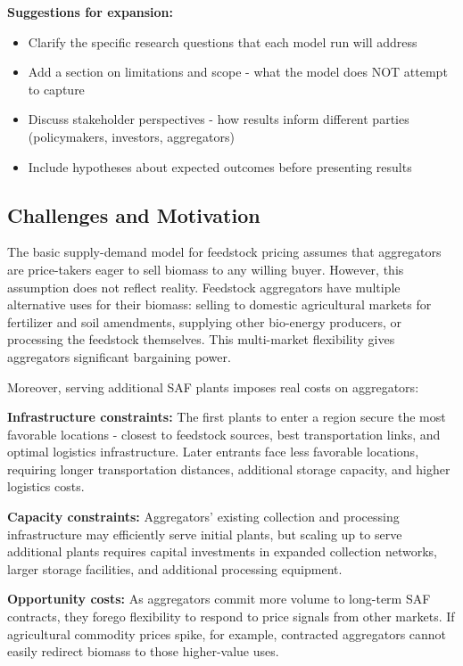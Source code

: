 \documentclass[10.5pt]{article}
\begin{document}
\textbf{Suggestions for expansion:}
\begin{itemize}
    \item Clarify the specific research questions that each model run will address
    \item Add a section on limitations and scope - what the model does NOT attempt to capture
    \item Discuss stakeholder perspectives - how results inform different parties (policymakers, investors, aggregators)
    \item Include hypotheses about expected outcomes before presenting results
\end{itemize}

\subsection{Challenges and Motivation}

The basic supply-demand model for feedstock pricing assumes that aggregators are price-takers eager to sell biomass to any willing buyer. However, this assumption does not reflect reality. Feedstock aggregators have multiple alternative uses for their biomass: selling to domestic agricultural markets for fertilizer and soil amendments, supplying other bio-energy producers, or processing the feedstock themselves. This multi-market flexibility gives aggregators significant bargaining power.

Moreover, serving additional SAF plants imposes real costs on aggregators:

\textbf{Infrastructure constraints:} The first plants to enter a region secure the most favorable locations - closest to feedstock sources, best transportation links, and optimal logistics infrastructure. Later entrants face less favorable locations, requiring longer transportation distances, additional storage capacity, and higher logistics costs.

\textbf{Capacity constraints:} Aggregators' existing collection and processing infrastructure may efficiently serve initial plants, but scaling up to serve additional plants requires capital investments in expanded collection networks, larger storage facilities, and additional processing equipment.

\textbf{Opportunity costs:} As aggregators commit more volume to long-term SAF contracts, they forego flexibility to respond to price signals from other markets. If agricultural commodity prices spike, for example, contracted aggregators cannot easily redirect biomass to those higher-value uses.
\end{document}
